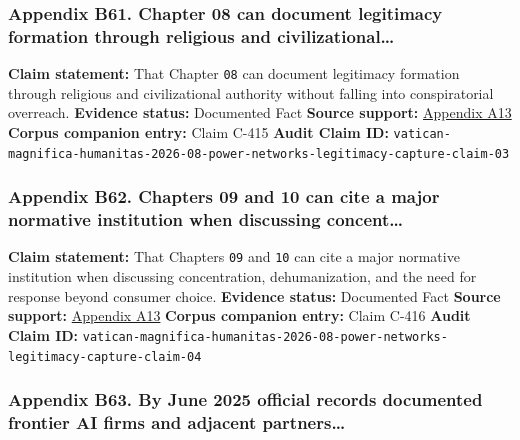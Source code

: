 \documentclass[
  american,
  11pt,
  letterpaper,
]{article}
\begin{document}
\subsubsection{Appendix B61. Chapter 08 can document legitimacy
formation through religious and
civilizational\ldots{}}\label{ch-08-appendix-b61-chapter-08-can-document-legitimacy-formation-through-religious-and-civilizational}

\textbf{Claim statement:} That Chapter \texttt{08} can document
legitimacy formation through religious and civilizational authority
without falling into conspiratorial overreach. \textbf{Evidence status:}
Documented Fact \textbf{Source support:}
\hyperref[ch-08-appendix-a13-encyclical-letter-of-his-holiness-leo-xiv-magnifica-humanitas]{Appendix
A13} \textbf{Corpus companion entry:} Claim C-415 \textbf{Audit Claim
ID:}
\texttt{vatican-magnifica-humanitas-2026-08-power-networks-legitimacy-capture-claim-03}

\subsubsection{Appendix B62. Chapters 09 and 10 can cite a major
normative institution when discussing
concent\ldots{}}\label{ch-08-appendix-b62-chapters-09-and-10-can-cite-a-major-normative-institution-when-discussing-concent}

\textbf{Claim statement:} That Chapters \texttt{09} and \texttt{10} can
cite a major normative institution when discussing concentration,
dehumanization, and the need for response beyond consumer choice.
\textbf{Evidence status:} Documented Fact \textbf{Source support:}
\hyperref[ch-08-appendix-a13-encyclical-letter-of-his-holiness-leo-xiv-magnifica-humanitas]{Appendix
A13} \textbf{Corpus companion entry:} Claim C-416 \textbf{Audit Claim
ID:}
\texttt{vatican-magnifica-humanitas-2026-08-power-networks-legitimacy-capture-claim-04}

\subsubsection{Appendix B63. By June 2025 official records documented
frontier AI firms and adjacent
partners\ldots{}}\label{ch-08-appendix-b63-by-june-2025-official-records-documented-frontier-ai-firms-and-adjacent-partners}
\end{document}
